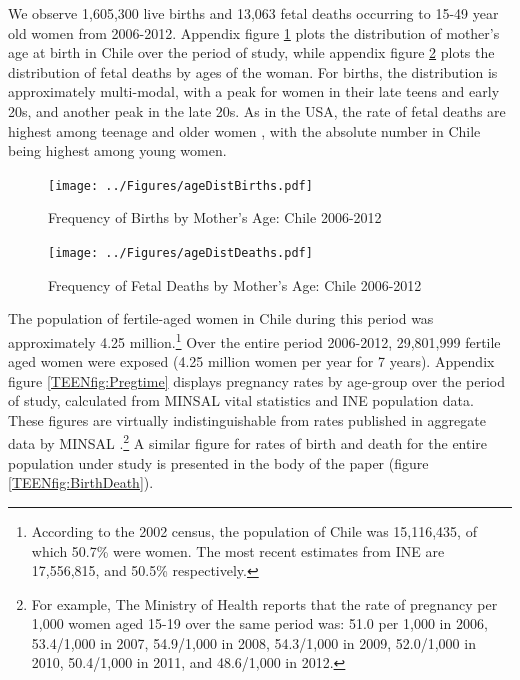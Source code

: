 \documentclass[11pt,subeqn]{article}
\begin{document}
\begin{spacing}{1.4}

We observe 1,605,300 live births and 13,063 fetal deaths occurring to 15-49 year 
old women from 2006-2012.  Appendix figure \ref{TEENfig:ageHist} plots the 
distribution of mother's age at birth in Chile over the period of study, while
appendix figure \ref{TEENfig:ageHistD} plots the distribution of fetal deaths by 
ages of the woman.  For births, the distribution is approximately multi-modal, 
with a peak for women in their late teens and early 20s, and another peak in the 
late 20s.  As in the USA, the rate of fetal deaths are highest among teenage and 
older women \citep{MacDormanGregory2015}, with the absolute number in Chile 
being highest among young women.

\begin{figure}[htpb!]
\begin{center}
\caption{Frequency of Births by Mother's Age: Chile 2006-2012}
\label{TEENfig:ageHist}
\texttt{[image: ../Figures/ageDistBirths.pdf]} 
\end{center}
\end{figure}

\begin{figure}[htpb!]
\begin{center}
\caption{Frequency of Fetal Deaths by Mother's Age: Chile 2006-2012}
\label{TEENfig:ageHistD}
\texttt{[image: ../Figures/ageDistDeaths.pdf]} 
\end{center}
\vspace{-4mm}
\end{figure}

The population of fertile-aged women in Chile during this period was 
approximately 4.25 million.\footnote{According to the 2002 census, the population
of Chile was 15,116,435, of which 50.7\% were women.  The most recent estimates
from INE are 17,556,815, and 50.5\% respectively.}  Over the entire period 
2006-2012, 29,801,999 fertile aged women were exposed (4.25 million women per 
year for 7 years).  Appendix figure \ref{TEENfig:Pregtime} displays pregnancy 
rates by age-group over the period of study, calculated from MINSAL vital
statistics and INE population data. These figures are virtually indistinguishable 
from rates published in aggregate data by MINSAL \citep{MINSAL2013}.\footnote{For
example, The Ministry of Health reports that the rate of pregnancy per 1,000
women aged 15-19 over the same period was: 51.0 per 1,000 in 2006, 53.4/1,000
in 2007, 54.9/1,000 in 2008, 54.3/1,000 in 2009, 52.0/1,000 in 2010, 
50.4/1,000 in 2011, and 48.6/1,000 in 2012.}  A similar figure for rates of
birth and death for the entire population under study is presented in the
body of the paper (figure \ref{TEENfig:BirthDeath}).


\end{spacing}
\end{document}
